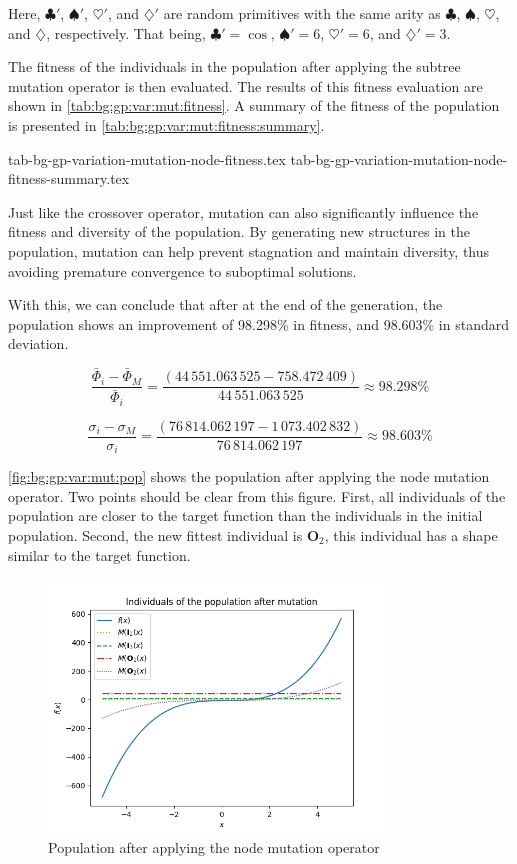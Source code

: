   Here, \(\clubsuit'\), \(\spadesuit'\), \(\heartsuit'\), and \(\diamondsuit'\)
  are random primitives with the same arity as \(\clubsuit\), \(\spadesuit\),
  \(\heartsuit\), and \(\diamondsuit\), respectively.
  That being, \(\clubsuit' = \cos\), \(\spadesuit' = 6\), \(\heartsuit' = 6\),
  and \(\diamondsuit' = 3\).

  The fitness of the individuals in the population after applying the subtree 
  mutation operator is then evaluated.
  The results of this fitness evaluation are shown in 
  \vref{tab:bg:gp:var:mut:fitness}.
  A summary of the fitness of the population is presented in 
  \vref{tab:bg:gp:var:mut:fitness:summary}.

  {tab-bg-gp-variation-mutation-node-fitness.tex}
  {tab-bg-gp-variation-mutation-node-fitness-summary.tex}


  Just like the crossover operator, mutation can also significantly influence 
  the fitness and diversity of the population.
  By generating new structures in the population, mutation can help prevent
  stagnation and maintain diversity, thus avoiding premature convergence to
  suboptimal solutions.

  With this, we can conclude that after at the end of the generation, the
  population shows an improvement of 98.298\% in fitness, and 98.603\% in
  standard deviation.

  \[
    \frac{\bar{\Phi}_i - \bar{\Phi}_M}{\bar{\Phi}_i}
      = \frac{(44\,551.063\,525 - 758.472\,409)}{44\,551.063\,525} 
      \approx 98.298\%
  \]

  \[
    \frac{\sigma_i - \sigma_M}{\sigma_i}
      = \frac{(76\,814.062\,197 - 1\,073.402\,832)}{76\,814.062\,197}
      \approx 98.603\%
  \]

  \vref{fig:bg:gp:var:mut:pop} shows the population after applying the node
  mutation operator.
  Two points should be clear from this figure.
  First, all individuals of the population are closer to the target function
  than the individuals in the initial population.
  Second, the new fittest individual is \(\mathbf{O}_2\), this individual has a
  shape similar to the target function.

  \begin{figure}[ht!]
    \centering
    \includegraphics[width=0.8\textwidth]
      {img/theoretical_framework/gp_pop_mutated.png}
    \caption{Population after applying the node mutation operator}
    \label{fig:bg:gp:var:mut:pop}
  \end{figure}

